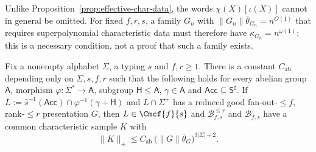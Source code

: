 Unlike Proposition~\ref{prop:effective-char-data}, the words $\chi(X)[\iota(X)]$
cannot in general be omitted.  For fixed $f,r,s$, a family $G_n$ with
$\|G_n\|\bar\theta_{G_n}=n^{O(1)}$ that requires superpolynomial characteristic
data must therefore have $\kappa_{G_n}=n^{\omega(1)}$; this is a necessary
condition, not a proof that such a family exists.

\begin{theorem}
\label{thm:mcfg-abelian-filter-data}
Fix a nonempty alphabet $\Sigma$, a typing $s$ and $f,r\ge1$.  There is a constant
$C_{\mathrm{ab}}$ depending only on $\Sigma,s,f,r$ such that the following holds for every
abelian group $\mathsf A$, morphism $\varphi:\Sigma^*\to\mathsf A$, subgroup
$\mathsf H\le\mathsf A$, $\gamma\in\mathsf A$ and $\mathsf{Acc}\subseteq\mathsf S^\sharp$.
If $L:=\widehat s^{-1}(\mathsf{Acc})\cap\varphi^{-1}(\gamma+\mathsf H)$ and $L\cap\Sigma^+$
has a reduced good fan-out-$\le f$, rank-$\le r$ presentation $G$, then
$L\in\Cmcf{f}{s}$ and $\mathcal B^{\le r}_{f,s}$ and $\mathcal B_{f,s}$ have a common
characteristic sample $K$ with
\[
 \|K\|_+\le C_{\mathrm{ab}}\,\bigl(\|G\|\bar\theta_G\bigr)^{3|\Sigma|+2}.
\]
\end{theorem}

